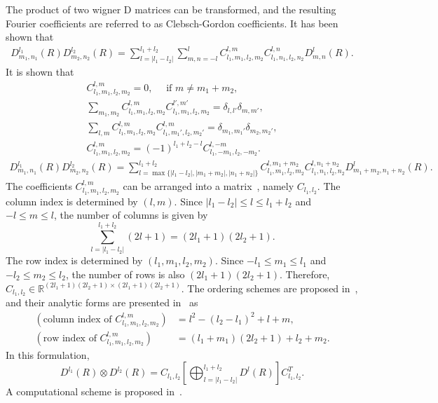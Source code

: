 \documentclass[onecolumn,11pt]{IEEEtran}
\newcommand{\bracket}[1]{\ensuremath{\left[ #1 \right]}}
\renewcommand{\Re}{\ensuremath{\mathbb{R}}}
\begin{document}
The product of two wigner D matrices can be transformed, and the resulting Fourier coefficients are referred to as Clebsch-Gordon coefficients. 
It has been shown that
\begin{align}
    D^{l_1}_{m_1,n_1} (R) D^{l_2}_{m_2,n_2}(R) = \sum_{l=|l_1-l_2|}^{l_1+l_2} \sum_{m,n=-l}^l C^{l,m}_{l_1,m_1,l_2,m_2} C^{l,n}_{l_1,n_1,l_2,n_2} D^{l}_{m,n}(R).
\end{align}
It is shown that
\begin{gather*}
    C^{l,m}_{l_1,m_1,l_2,m_2} = 0,\quad \text{ if } m \neq m_1 + m_2,\\
    \sum_{m_1,m_2} C^{l,m}_{l_1,m_1,l_2,m_2} C^{l',m'}_{l_1,m_1,l_2,m_2} = \delta_{l,l'}\delta_{m,m'},\\
    \sum_{l,m} C^{l,m}_{l_1,m_1,l_2,m_2} C^{l,m}_{l_1,m_1',l_2,m_2'} = \delta_{m_1,m_1'}\delta_{m_2,m_2'},\\
    C^{l,m}_{l_1,m_1,l_2,m_2} = (-1)^{l_1+l_2-l} C^{l,-m}_{l_1,-m_1,l_2,-m_2}.
\end{gather*}
\begin{align}
    D^{l_1}_{m_1,n_1} (R) D^{l_2}_{m_2,n_2}(R) = \sum_{l=\max\{|l_1-l_2|,|m_1+m_2|,|n_1+n_2|\}}^{l_1+l_2} C^{l,m_1+m_2}_{l_1,m_1,l_2,m_2} C^{l,n_1+n_2}_{l_1,n_1,l_2,n_2} D^{l}_{m_1+m_2,n_1+n_2}(R).
\end{align}
The coefficients $C^{l,m}_{l_1,m_1,l_2,m_2}$ can be arranged into a matrix~\cite{MarPec11}, namely $C_{l_1,l_2}$. 
The column index is determined by $(l,m)$. 
Since $|l_1-l_2|\leq l \leq l_1+l_2$ and $-l\leq m \leq l$, the number of columns is given by
\[
    \sum_{l=|l_1-l_2|}^{l_1+l_2} (2l+1) = (2l_1+1)(2l_2+1).
\]
The row index is determined by $(l_1,m_1,l_2,m_2)$. 
Since $-l_1\leq m_1 \leq l_1$ and $-l_2\leq m_2\leq l_2$, the number of rows is also $(2l_1+1)(2l_2+1)$. 
Therefore, $C_{l_1,l_2} \in \Re^{(2l_1+1)(2l_2+1)\times(2l_1+1)(2l_2+1)}$.
The ordering schemes are proposed in~\cite{MarPec11}, and their analytic forms are presented in~\cite{Dif17} as
\begin{align*}
    (\text{column index of } C^{l,m}_{l_1,m_1,l_2,m_2}) &= l^2-(l_2-l_1)^2 + l + m,\\
    (\text{row index of } C^{l,m}_{l_1,m_1,l_2,m_2}) &= (l_1+m_1)(2l_2+1) + l_2+m_2.
\end{align*}
In this formulation, 
\begin{equation}
    D^{l_1}(R) \otimes D^{l_2}(R) = C_{l_1,l_2} \bracket{ \bigoplus_{l=|l_1-l_2|}^{l_1+l_2} D^l(R)} C_{l_1,l_2}^T.\label{eqn:Clebsch_Gordon}
\end{equation}
A computational scheme is proposed in~\cite{Str14}. 
\end{document}

